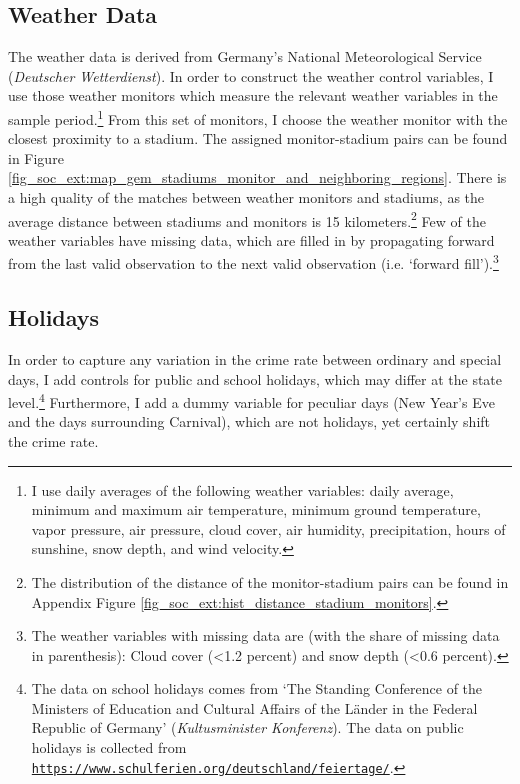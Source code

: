 \subsection{Weather Data}
The weather data is derived from Germany's National Meteorological Service (\textit{Deutscher Wetterdienst}). In order to construct the weather control variables, I use those weather monitors which measure the relevant weather variables in the sample period.\footnote{I use daily averages of the following weather variables: daily average, minimum and maximum air temperature, minimum ground temperature, vapor pressure, air pressure, cloud cover, air humidity, precipitation, hours of sunshine, snow depth, and wind velocity.} From this set of monitors, I choose the weather monitor with the closest proximity to a stadium. The assigned monitor-stadium pairs can be found in Figure \ref{fig_soc_ext:map_gem_stadiums_monitor_and_neighboring_regions}. There is a high quality of the matches between weather monitors and stadiums, as the average distance between stadiums and monitors is 15 kilometers.\footnote{The distribution of the distance of the monitor-stadium pairs can be found in Appendix Figure \ref{fig_soc_ext:hist_distance_stadium_monitors}.} Few of the weather variables have missing data, which are filled in by propagating forward from the last valid observation to the next valid observation (i.e. `forward fill').\footnote{The weather variables with missing data are (with the share of missing data in parenthesis): Cloud cover (<1.2 percent) and snow depth (<0.6 percent).}



\subsection{Holidays}
In order to capture any variation in the crime rate between ordinary and special days, I add controls for public and school holidays, which may differ at the state level.\footnote{The data on school holidays comes from `The Standing Conference of the Ministers of Education and Cultural Affairs of the Länder in the Federal Republic of Germany' (\textit{Kultusminister Konferenz}). The data on public holidays is collected from \href{https://www.schulferien.org/deutschland/feiertage/}{\tt https://www.schulferien.org/deutschland/feiertage/}.} Furthermore, I add a dummy variable for peculiar days (New Year's Eve and the days surrounding Carnival), which are not holidays, yet certainly shift the crime rate.



